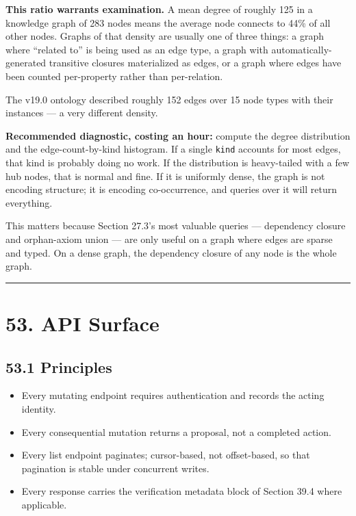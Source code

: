 \documentclass[
  11pt]{report}
\providecommand{\tightlist}{%
  \setlength{\itemsep}{0pt}\setlength{\parskip}{0pt}}
\begin{document}
\textbf{This ratio warrants examination.} A mean degree of roughly 125
in a knowledge graph of 283 nodes means the average node connects to
44\% of all other nodes. Graphs of that density are usually one of three
things: a graph where ``related to'' is being used as an edge type, a
graph with automatically-generated transitive closures materialized as
edges, or a graph where edges have been counted per-property rather than
per-relation.

The v19.0 ontology described roughly 152 edges over 15 node types with
their instances --- a very different density.

\textbf{Recommended diagnostic, costing an hour:} compute the degree
distribution and the edge-count-by-kind histogram. If a single
\texttt{kind} accounts for most edges, that kind is probably doing no
work. If the distribution is heavy-tailed with a few hub nodes, that is
normal and fine. If it is uniformly dense, the graph is not encoding
structure; it is encoding co-occurrence, and queries over it will return
everything.

This matters because Section 27.3's most valuable queries --- dependency
closure and orphan-axiom union --- are only useful on a graph where
edges are sparse and typed. On a dense graph, the dependency closure of
any node is the whole graph.

\begin{center}\rule{0.5\linewidth}{0.5pt}\end{center}

\hypertarget{api-surface}{%
\chapter{53. API Surface}\label{api-surface}}

\hypertarget{principles}{%
\section{53.1 Principles}\label{principles}}

\begin{itemize}
\tightlist
\item
  Every mutating endpoint requires authentication and records the acting
  identity.
\item
  Every consequential mutation returns a proposal, not a completed
  action.
\item
  Every list endpoint paginates; cursor-based, not offset-based, so that
  pagination is stable under concurrent writes.
\item
  Every response carries the verification metadata block of Section 39.4
  where applicable.
\end{itemize}
\end{document}
